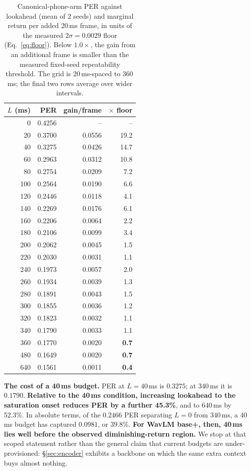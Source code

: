 \documentclass[journal]{IEEEtran}
\begin{document}
\begin{table}[t]
\centering\footnotesize
\setlength{\tabcolsep}{4pt}
\renewcommand{\arraystretch}{0.93}
\caption{Canonical-phone-arm PER against lookahead (mean of 2 seeds) and marginal
return per added 20\,ms frame, in units of the measured $2\sigma{=}0.0029$
floor (Eq.~\ref{eq:floor}). Below $1.0\times$, the gain from an additional
frame is smaller than the measured fixed-seed repeatability threshold. The grid is 20\,ms-spaced to 360\,ms; the final two rows
average over wider intervals.}
\label{tab:dense}
\begin{tabular}{rrrr}
\toprule
$L$ (ms) & PER & gain/frame & $\times$ floor \\
\midrule
0   & 0.4256 & --      & -- \\
20  & 0.3700 & 0.0556  & 19.2 \\
40  & 0.3275 & 0.0426  & 14.7 \\
60  & 0.2963 & 0.0312  & 10.8 \\
80  & 0.2754 & 0.0209  & 7.2 \\
100 & 0.2564 & 0.0190  & 6.6 \\
120 & 0.2446 & 0.0118  & 4.1 \\
140 & 0.2269 & 0.0176  & 6.1 \\
160 & 0.2206 & 0.0064  & 2.2 \\
180 & 0.2106 & 0.0099  & 3.4 \\
200 & 0.2062 & 0.0045  & 1.5 \\
220 & 0.2030 & 0.0031  & 1.1 \\
240 & 0.1973 & 0.0057  & 2.0 \\
260 & 0.1934 & 0.0039  & 1.3 \\
280 & 0.1891 & 0.0043  & 1.5 \\
300 & 0.1855 & 0.0036  & 1.2 \\
320 & 0.1823 & 0.0032  & 1.1 \\
340 & 0.1790 & 0.0033  & 1.1 \\
360 & 0.1770 & 0.0020  & \textbf{0.7} \\
480 & 0.1649 & 0.0020  & \textbf{0.7} \\
640 & 0.1561 & 0.0011  & \textbf{0.4} \\
\bottomrule
\end{tabular}
\end{table}

\textbf{The cost of a 40\,ms budget.} PER at $L{=}40$\,ms is $0.3275$; at
340\,ms it is $0.1790$. \textbf{Relative to the 40\,ms condition, increasing
lookahead to the saturation onset reduces PER by a further 45.3\%}, and to
640\,ms by 52.3\%. In absolute terms, of the $0.2466$ PER separating $L{=}0$
from $340$\,ms, a 40\,ms budget has captured $0.0981$, or $39.8\%$.
\textbf{For WavLM base+, then, 40\,ms lies well before the observed
diminishing-return region.} We stop at that scoped statement rather than the
general claim that current budgets are under-provisioned: \S\ref{sec:encoder}
exhibits a backbone on which the same extra context buys almost nothing.
\end{document}
